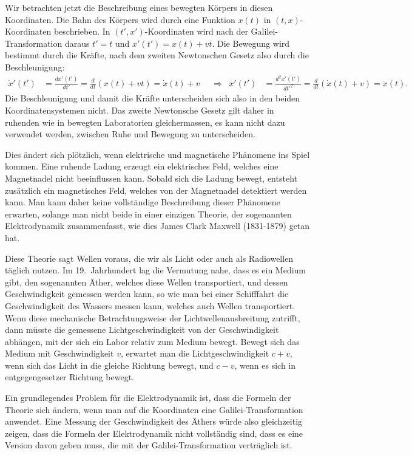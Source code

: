 Wir betrachten jetzt die Beschreibung eines bewegten Körpers in diesen
Koordinaten.
Die Bahn des Körpers wird durch eine Funktion $x(t)$ in $(t,x)$-Koordinaten
beschrieben.
In $(t',x')$-Koordinaten wird nach der Galilei-Transformation daraus
$t'=t$ und $x'(t')=x(t)+vt$.
Die Bewegung wird bestimmt durch die Kräfte, nach dem zweiten Newtonschen
Gesetz also durch die Beschleunigung:
\begin{align}
\dot x'(t')
&=
\frac{dx'(t')}{dt'}
=
\frac{d}{dt}(x(t)+vt)
=
\dot x(t) + v
&&\Rightarrow&
\ddot x'(t')
&=
\frac{d^2x'(t')}{dt'^2}
=
\frac{d}{dt} (\dot x(t) + v)
=
\ddot x(t).
\end{align}
Die Beschleunigung und damit die Kräfte unterscheiden sich also in den
beiden Koordinatensystemen nicht.
Das zweite Newtonsche Gesetz gilt daher in ruhenden wie in bewegten
Laboratorien gleichermassen, es kann nicht dazu verwendet werden, zwischen
Ruhe und Bewegung zu unterscheiden.

Dies ändert sich plötzlich, wenn elektrische und magnetische Phänomene
ins Spiel kommen.
Eine ruhende Ladung erzeugt ein elektrisches Feld, welches eine Magnetnadel
nicht beeinflussen kann.
Sobald sich die Ladung bewegt, entsteht zusätzlich ein magnetisches Feld,
welches von der Magnetnadel detektiert werden kann.
Man kann daher keine voll\-ständige Beschreibung dieser Phänomene erwarten,
solange man nicht beide in einer einzigen Theorie, der sogenannten
Elektrodynamik zusammenfasst, wie dies James Clark Maxwell (1831-1879)
getan hat.

Diese Theorie sagt Wellen voraus, die wir als Licht oder auch als Radiowellen
täglich nutzen.
Im 19.~Jahrhundert lag die Vermutung nahe, dass es ein Medium gibt,
den sogenannten Äther, welches
diese Wellen transportiert, und dessen Geschwindigkeit gemessen werden
kann, so wie man bei einer Schifffahrt die Geschwindigkeit des Wassers
messen kann, welches auch Wellen transportiert.
%
Wenn diese mechanische Betrachtungsweise der Lichtwellenausbreitung
zutrifft, dann müsste die gemessene Lichtgeschwindigkeit von der
Geschwindigkeit abhängen, mit der sich ein Labor relativ zum Medium
bewegt.
Bewegt sich das Medium mit Geschwindigkeit $v$, erwartet man die
Lichtgeschwindigkeit $c+v$, wenn sich das Licht in die gleiche Richtung
bewegt, und $c-v$, wenn es sich in entgegengesetzer Richtung bewegt.

Ein grundlegendes Problem für die Elektrodynamik ist, dass die
Formeln der Theorie sich ändern, wenn man auf die Koordinaten eine
Galilei-Transformation anwendet.
Eine Messung der Geschwindigkeit des Äthers würde also gleichzeitig
zeigen, dass die Formeln der Elektrodynamik nicht voll\-ständig sind,
dass es eine Version davon geben muss, die mit der Galilei-Transformation
verträglich ist.

